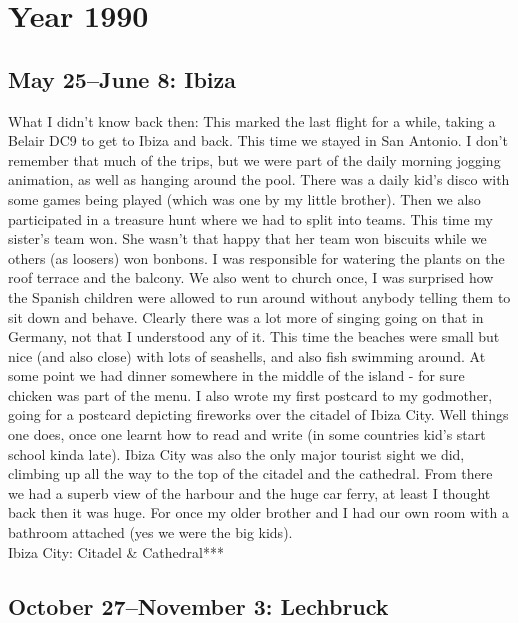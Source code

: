 \chapter{Year 1990}
\label{1990}

\section{May 25--June 8: Ibiza}
\label{1990:Ibiza}

What I didn't know back then: This marked the last flight for a while, taking a Belair DC9 to get to Ibiza and back. This time we stayed in San Antonio. I don't remember that much of the trips, but we were part of the daily morning jogging animation, as well as hanging around the pool. There was a daily kid's disco with some games being played (which was one by my little brother). Then we also participated in a treasure hunt where we had to split into teams. This time my sister's team won. She wasn't that happy that her team won biscuits while we others (as loosers) won bonbons. I was responsible for watering the plants on the roof terrace and the balcony. We also went to church once, I was surprised how the Spanish children were allowed to run around without anybody telling them to sit down and behave. Clearly there was a lot more of singing going on that in Germany, not that I understood any of it. This time the beaches were small but nice (and also close) with lots of seashells, and also fish swimming around. At some point we had dinner somewhere in the middle of the island - for sure chicken was part of the menu. I also wrote my first postcard to my godmother, going for a postcard depicting fireworks over the citadel of Ibiza City. Well things one does, once one learnt how to read and write (in some countries kid's start school kinda late). Ibiza City was also the only major tourist sight we did, climbing up all the way to the top of the citadel and the cathedral. From there we had a superb view of the harbour and the huge car ferry, at least I thought back then it was huge. For once my older brother and I had our own room with a bathroom attached (yes we were the big kids).\\

Ibiza City: Citadel \& Cathedral***


\section{October 27--November 3: Lechbruck}
\label{1990: Lechbruck}

